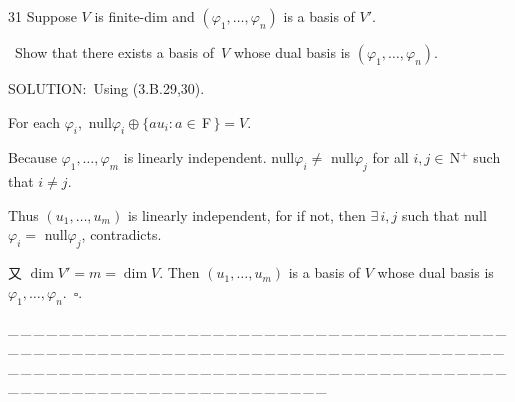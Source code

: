 \documentclass[a4paper, 11pt, UTF8]{article}
\def\Fbf{$\,{\timesbf F}\,$}
\def\Nbp{$\,{\timesbf N}$^+}
\begin{document}
\begin{large}
{\timesbf\Large 31} {\timessl\Large 
Suppose $V$ is finite-dim and $(\varphi_1,\dots,\varphi_n)$ is a basis of $V'$.}\par\quad\,
{\timessl\Large Show that
there exists a basis of \,$V$ whose dual basis is $(\varphi_1,\dots,\varphi_n).$
}\par
{\timesbf S{\small OLUTION:}}\,\,\,Using (3.B.29,30).\par\quad For each $\varphi_i$,\,\,\,null$\varphi_i\oplus\{au_i:a\in\Fbf\}=V.$\par\quad
Because $\varphi_1,\dots,\varphi_m$ is linearly independent. null$\varphi_i\neq$ null$\varphi_j$ for all $i,j\in\Nbp$ such that $i\neq j$.\par\quad
Thus $(u_1,\dots,u_m)$ is linearly independent, for if not, then $\exists\,i,j$ such that null$\varphi_i=$ null$\varphi_j$, contradicts.\par\quad
又 $\dim V'=m=\dim V$. Then $(u_1,\dots,u_m)$ is a basis of $V$ whose dual basis is $\varphi_1,\dots,\varphi_n.\,\,\,\square$.\par
{\tiny \_\,\_\,\_\,\_\,\_\,\_\,\_\,\_\,\_\,\_\,\_\,\_\,\_\,\_\,\_\,\_\,\_\,\_\,\_\,\_\,\_\,\_\,\_\,\_\,\_\,\_\,\_\,\_\,\_\,\_\,\_\,\_\,\_\,\_\,\_\,\_\,\_\,\_\,\_\,\_\,\_\,\_\,\_\,\_\,\_\,\_\,\_\,\_\,\_\,\_\,\_\,\_\,\_\,\_\,\_\,\_\,\_\,\_\,\_\,\_\,\_\,\_\,\_\,\_\,\_\,\_\,\_\,\_\,\_\,\_\,\_\_\,\_\,\_\,\_\,\_\,\_\,\_\,\_\,\_\,\_\,\_\,\_\,\_\,\_\,\_\,\_\,\_\,\_\,\_\,\_\,\_\,\_\,\_\,\_\,\_\,\_\,\_\,\_\,\_\,\_\,\_\,\_\,\_\,\_\,\_\,\_\,\_\,\_\,\_\,\_\,\_\,\_\,\_\,\_\,\_\,\_\,\_\,\_\,\_\,\_\,\_\,\_\,\_\,\_\,\_\,\_\,\_\,\_\,\_\,\_\,\_\,\_\,\_\,\_\,\_\,\_\,\_\,\_\,\_\,\_\,\_}\par


\end{large}
\end{document}
